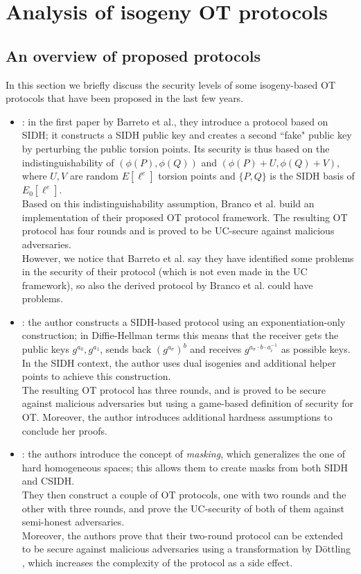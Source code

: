 \chapter{Analysis of isogeny OT protocols}

\section{An overview of proposed protocols}
In this section we briefly discuss the security levels of some isogeny-based OT protocols that have been proposed in the last few years.

\begin{itemize}
    \item \cite{Barreto, Branco}: in the first paper by Barreto et al., they introduce a protocol based on SIDH; it constructs a SIDH public key and creates a second ``fake" public key by perturbing the public torsion points. Its security is thus based on the indistinguishability of $(\phi(P),\phi(Q))$ and $(\phi(P)+U,\phi(Q)+V)$, where $U,V$ are random $E[\ell^e]$ torsion points and $\{P,Q\}$ is the SIDH basis of $E_0[\ell^e]$.\\
    Based on this indistinguishability assumption, Branco et al. build an implementation of their proposed OT protocol framework. The resulting OT protocol has four rounds and is proved to be UC-secure against malicious adversaries.\\
    However, we notice that Barreto et al. say they have identified some problems in the security of their protocol (which is not even made in the UC framework), so also the derived protocol by Branco et al. could have problems.
    
    \item \cite{Vitse}: the author constructs a SIDH-based protocol using an exponentiation-only construction; in Diffie-Hellman terms this means that the receiver gets the public keys $g^{a_0},g^{a_1}$, sends back $\left(g^{a_\sigma}\right)^b$ and receives $g^{a_\sigma\cdot b\cdot a_i^{-1}}$ as possible keys. In the SIDH context, the author uses dual isogenies and additional helper points to achieve this construction.\\
    The resulting OT protocol has three rounds, and is proved to be secure against malicious adversaries but using a game-based definition of security for OT. Moreover, the author introduces additional hardness assumptions to conclude her proofs.
    
    \item \cite{dSG_Orsini}: the authors introduce the concept of \emph{masking}, which generalizes the one of hard homogeneous spaces; this allows them to create masks from both SIDH and CSIDH.\\
    They then construct a couple of OT protocols, one with two rounds and the other with three rounds, and prove the UC-security of both of them against semi-honest adversaries.\\
    Moreover, the authors prove that their two-round protocol can be extended to be secure against malicious adversaries using a transformation by D{\"o}ttling \cite{Dottling}, which increases the complexity of the protocol as a side effect.
    

\end{itemize}
